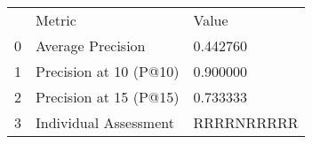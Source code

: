 \begin{tabular}{lll}
 & Metric & Value \\
0 & Average Precision & 0.442760 \\
1 & Precision at 10 (P@10) & 0.900000 \\
2 & Precision at 15 (P@15) & 0.733333 \\
3 & Individual Assessment & RRRRNRRRRR \\
\end{tabular}
